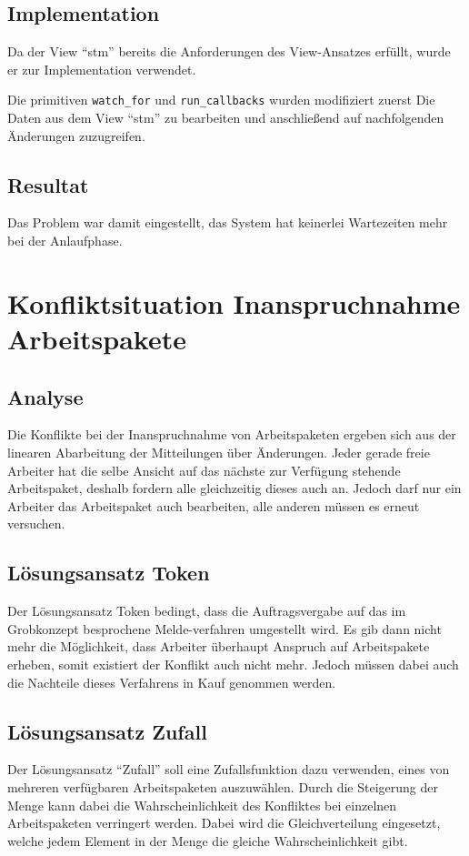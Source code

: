 \subsection{Implementation}
Da der View ``stm'' bereits die Anforderungen des View-Ansatzes erfüllt,
wurde er zur Implementation verwendet.

Die primitiven \verb|watch_for| und \verb|run_callbacks| wurden modifiziert zuerst
Die Daten aus dem View ``stm'' zu bearbeiten und anschließend 
auf nachfolgenden Änderungen zuzugreifen.

\subsection{Resultat}
Das Problem war damit eingestellt, das System hat keinerlei Wartezeiten mehr bei der Anlaufphase.


\section{Konfliktsituation Inanspruchnahme Arbeitspakete}
\subsection{Analyse}
Die Konflikte bei der Inanspruchnahme von Arbeitspaketen ergeben sich aus der linearen Abarbeitung der Mitteilungen über Änderungen.
Jeder gerade freie Arbeiter hat die selbe Ansicht auf das nächste zur Verfügung stehende Arbeitspaket, deshalb fordern alle gleichzeitig dieses auch an.
Jedoch darf nur ein Arbeiter das Arbeitspaket auch bearbeiten,
alle anderen müssen es erneut versuchen.

\subsection{Lösungsansatz Token}
Der Lösungsansatz Token bedingt, dass die Auftragsvergabe auf das im Grobkonzept besprochene Melde-verfahren umgestellt wird.
Es gib dann nicht mehr die Möglichkeit, dass Arbeiter überhaupt Anspruch auf Arbeitspakete erheben, somit existiert der Konflikt auch nicht mehr.
Jedoch müssen dabei auch die Nachteile dieses Verfahrens in Kauf genommen werden.

\subsection{Lösungsansatz Zufall}

Der Lösungsansatz ``Zufall'' soll eine Zufallsfunktion dazu verwenden,
eines von mehreren verfügbaren Arbeitspaketen auszuwählen.
Durch die Steigerung der Menge kann dabei die Wahrscheinlichkeit des Konfliktes bei einzelnen Arbeitspaketen verringert werden. Dabei wird die Gleichverteilung eingesetzt, welche jedem Element in der Menge die gleiche Wahrscheinlichkeit gibt.

